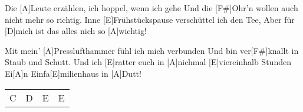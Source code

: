 
\hspace{\fill}

\begin{guitar}
	Die [A]Leute erzählen, ich hoppel, wenn ich gehe
	Und die [F#]Ohr'n wollen auch nicht mehr so richtig.
	Inne [E]Frühstückspause verschüttel ich den Tee,
	Aber für [D]mich ist das alles nich so [A]wichtig!
	
	Mit mein' [A]Presslufthammer fühl ich mich verbunden
	Und bin ver[F#]knallt in Staub und Schutt.
	Und ich [E]ratter euch in [A]nichmal [E]viereinhalb Stunden
	Ei[A]n Einfa[E]milienhaus in [A]Dutt!
	
	 {\footnotesize\begin{tabular}{l|l|l|l}
			C & D & E & E 
	\end{tabular}}

\end{guitar}

\vspace{-4em}\hspace{\fill} 

